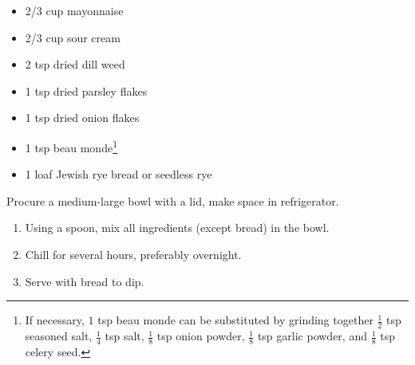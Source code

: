 
\RequirePackage{../recipe}




\thispagestyle{firstpage}

\ingredients
\begin{itemize}
    \item 2/3 cup mayonnaise
    \item 2/3 cup sour cream
    \item 2 tsp dried dill weed
    \item 1 tsp dried parsley flakes
    \item 1 tsp dried onion flakes
    \item 1 tsp beau monde\renewcommand{\thefootnote}{\fnsymbol{footnote}}\footnote[2]{If necessary, $1$ tsp beau monde can be substituted by grinding together $\frac{1}{2}$ tsp seasoned salt, $\frac{1}{4}$ tsp salt, $\frac{1}{8}$ tsp onion powder, $\frac{1}{8}$ tsp garlic powder, and $\frac{1}{8}$ tsp celery seed.}
    \item 1 loaf Jewish rye bread or seedless rye
\end{itemize}
\instructions
Procure a medium-large bowl with a lid, make space in refrigerator.
\begin{enumerate}
    \item Using a spoon, mix all ingredients (except bread) in the bowl.
    \item Chill for several hours, preferably overnight.
    \item Serve with bread to dip.
\end{enumerate}


